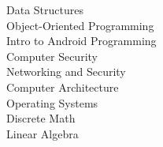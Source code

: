 \documentclass[letterpaper]{deedy-resume} %
\begin{document}
\begin{minipage}[t]{0.33\textwidth}
Data Structures\\
Object-Oriented Programming\\
Intro to Android Programming\\
Computer Security\\
Networking and Security\\
Computer Architecture\\
Operating Systems\\
Discrete Math\\
Linear Algebra




\end{minipage} %
\hfill
%
%
\end{document}
